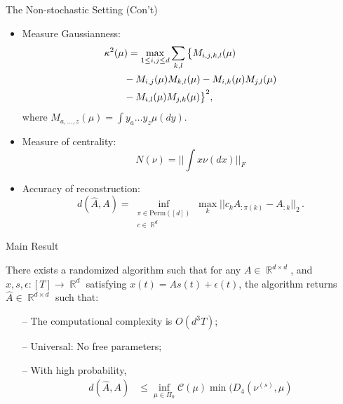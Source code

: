 \documentclass[final]{beamer} %
\newcommand{\eps}{\epsilon}
\DeclareMathOperator{\real}{\mathbb{R}}
\begin{document}
\begin{frame}[c]
\begin{columns}[t,totalwidth=\textwidth]
	\begin{column}{.32\textwidth}%
		\begin{block}{The Non-stochastic Setting (Con't)}
			\begin{itemize}
				\item Measure Gaussianness:
					\begin{align*}
							\MoveEqLeft \kappa^2(\mu)  =   \max_{1\le i,j\le d} \sum_{k,l} 
							\big\{ 
							M_{i,j,k,l}(\mu) \\
							& - M_{i,j}(\mu) M_{k,l}(\mu) -  M_{i,k}(\mu) M_{j,l}(\mu) \\
							& - M_{i,l}(\mu) M_{j,k}(\mu)\big\}^2,
					\end{align*}
					where $M_{a,\dots,z}(\mu) = \int y_a \dots y_z \mu(dy)$.
				\item Measure of centrality: 
					\[
				 	N(\nu) = ||\int x \nu(dx) ||_F
					\]
				\item Accuracy of reconstruction:
					\[
					d(\hat{A},A) = \inf_{
						 \substack{\pi \in \mathrm{Perm}([d])\\
						 c\in \real^d}} \max_{k} 
						|| c_k A_{:\pi(k)} - A_{:k} ||_2\,.
					\]
			\end{itemize}
		\end{block}
		\vspace{0.5ex}
		\begin{block}{Main Result}
		\begin{center}
				\begin{tcolorbox}[title = \vspace{0.4cm}\textbf{\large Main Result} \vspace{0.4cm}, title filled, width = 0.95\textwidth, colback = uofagreen!10, colframe = red]
						\vspace{0.5cm}
						There exists a randomized algorithm such that 
						for any $A\in \real^{d\times d}$, and $x, s, \eps: [T] \rightarrow \real^d$ satisfying $x(t) = As(t)+\eps(t)$,
						the algorithm returns $\hat{A}\in \real^{d \times d}$ such that:
							\begin{itemize}
								\item[--] The computational complexity is $O(d^3 T)$;
								\item[--] Universal: No free parameters;
								\item[--] With high probability, 
									\begin{align*}
									d(\hat{A}, A) & \le 
									\inf_{\mu\in \Pi_0} \mathcal{C}(\mu) \min\Big(D_4(\nu^{(s)},\mu) \\

\end{align*}
\end{itemize}
\end{tcolorbox}
\end{center}
\end{block}
\end{column}
\end{columns}
\end{frame}
\end{document}
